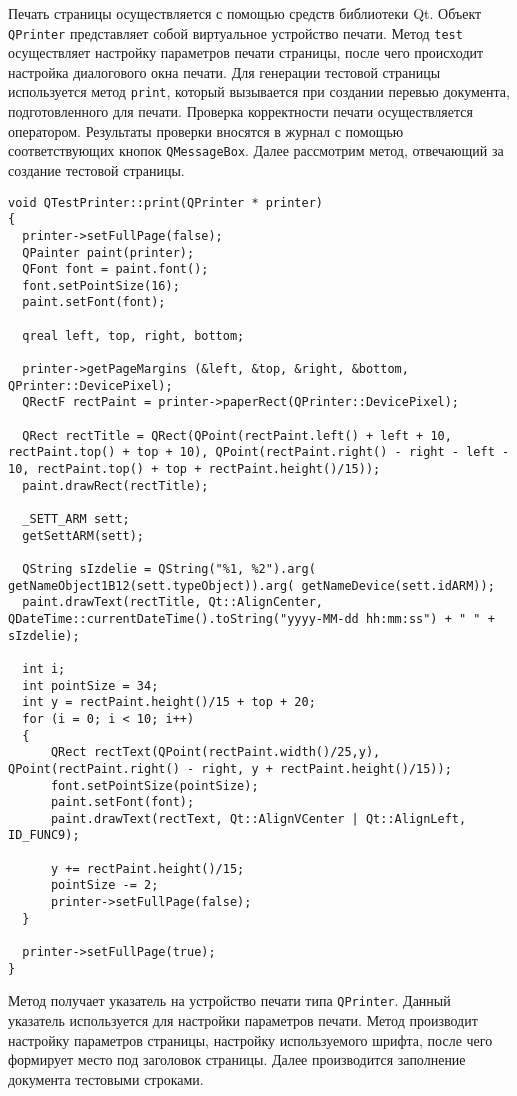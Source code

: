 Печать страницы осуществляется с помощью средств библиотеки Qt. Объект \texttt{QPrinter} представляет собой виртуальное
устройство печати. Метод \texttt{test} осуществляет настройку параметров печати страницы, после чего происходит
настройка диалогового окна печати. Для генерации тестовой страницы используется метод \texttt{print}, который вызывается
при создании перевью документа, подготовленного для печати. Проверка корректности печати осуществляется оператором.
Результаты проверки вносятся в журнал с помощью соответствующих кнопок \texttt{QMessageBox}. Далее рассмотрим метод,
отвечающий за создание тестовой страницы.
\medskip
\begin{verbatim}
void QTestPrinter::print(QPrinter * printer)
{
  printer->setFullPage(false);
  QPainter paint(printer);
  QFont font = paint.font();
  font.setPointSize(16);
  paint.setFont(font);

  qreal left, top, right, bottom;

  printer->getPageMargins (&left, &top, &right, &bottom, QPrinter::DevicePixel);
  QRectF rectPaint = printer->paperRect(QPrinter::DevicePixel);

  QRect rectTitle = QRect(QPoint(rectPaint.left() + left + 10, rectPaint.top() + top + 10), QPoint(rectPaint.right() - right - left - 10, rectPaint.top() + top + rectPaint.height()/15));
  paint.drawRect(rectTitle);

  _SETT_ARM sett;
  getSettARM(sett);

  QString sIzdelie = QString("%1, %2").arg( getNameObject1B12(sett.typeObject)).arg( getNameDevice(sett.idARM));
  paint.drawText(rectTitle, Qt::AlignCenter, QDateTime::currentDateTime().toString("yyyy-MM-dd hh:mm:ss") + " " + sIzdelie);

  int i;
  int pointSize = 34;
  int y = rectPaint.height()/15 + top + 20;
  for (i = 0; i < 10; i++)
  {
	  QRect rectText(QPoint(rectPaint.width()/25,y), QPoint(rectPaint.right() - right, y + rectPaint.height()/15));
	  font.setPointSize(pointSize);
	  paint.setFont(font);
	  paint.drawText(rectText, Qt::AlignVCenter | Qt::AlignLeft, ID_FUNC9);

	  y += rectPaint.height()/15;
	  pointSize -= 2;
	  printer->setFullPage(false);
  }

  printer->setFullPage(true);
}

\end{verbatim}
\medskip

Метод получает указатель на устройство печати типа \texttt{QPrinter}. Данный указатель используется для настройки
параметров печати. Метод производит настройку параметров страницы, настройку используемого шрифта, после чего формирует
место под заголовок страницы. Далее производится заполнение документа тестовыми строками.

